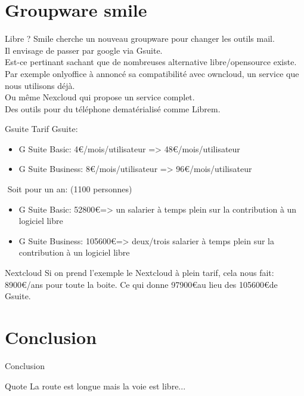 \documentclass{beamer}
\begin{document}
\section{Groupware smile}
\begin{frame}{Libre ?}
Smile cherche un nouveau groupware pour changer les outils mail.\\
Il envisage de passer par google via Gsuite.\\
Est-ce pertinant sachant que de nombreuses alternative libre/opensource existe.\newline
\newline
Par exemple onlyoffice à annoncé sa compatibilité avec owncloud, un service que nous utilisons déjà.\\
Ou même Nexcloud qui propose un service complet.\\
Des outils pour du téléphone dematérialisé comme Librem.
\end{frame}

\begin{frame}{Gsuite}
	Tarif Gsuite:
	\begin{itemize}
		\item G Suite Basic: 4\euro/mois/utilisateur => 48\euro/mois/utilisateur
		\item G Suite Business: 8\euro/mois/utilisateur => 96\euro/mois/utilisateur
	\end{itemize}

	$ $\newline
	Soit pour un an: \tiny(1100 personnes)\normalsize \\
	\begin{itemize}
		\item G Suite Basic: 52800\euro\space => un salarier à temps plein sur la contribution à un logiciel libre
		\item G Suite Business: 105600\euro\space => deux/trois salarier à temps plein sur la contribution à un logiciel libre
	\end{itemize}
\end{frame}

\begin{frame}{Nextcloud}
	Si on prend l'exemple le Nextcloud à plein tarif, cela nous fait: \\
	8900\euro/ans pour toute la boite. \newline
	\newline
	Ce qui donne 97900\euro\space au lieu des 105600\euro\space de Gsuite.
\end{frame}


\section{Conclusion}
\begin{frame}{Conclusion}
	\begin{block}{Quote}
		La route est longue mais la voie est libre...
	\end{block}
\end{frame}
\end{document}
